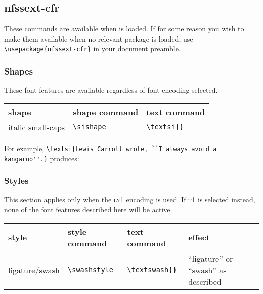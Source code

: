 \documentclass[11pt,british]{article}
\begin{document}
\subsection{nfssext-cfr}

These commands are available when  is loaded. If for some reason you wish to make them available when no relevant package is loaded, use \verb|\usepackage{nfssext-cfr}| in your document preamble.


\subsubsection{Shapes}

These font features are available regardless of font encoding selected.

	\begin{longtable}{lll}
		\toprule
		\textbf{shape}			&	\textbf{shape command}	&	\textbf{text command}\\\midrule\endhead
		\bottomrule\endfoot
		italic small-caps		&	\verb|\sishape|					&	\verb|\textsi{}|\\
	\end{longtable}

	For example, \verb|\textsi{Lewis Carroll wrote, ``I always avoid a kangaroo''.}| produces:
		\begin{center}
		\end{center}

\subsubsection{Styles}

This section applies only when the \textsc{ly1} encoding is used. If \textsc{t1} is selected instead, none of the font features described here will be active.

	\begin{longtable}{llll}
		\toprule
		\textbf{style}			&	\textbf{style command}	&	\textbf{text command}	&	\textbf{effect}\\\midrule\endhead
		\bottomrule\endfoot
		ligature/swash			&	\verb|\swashstyle|				&	\verb|\textswash{}|			&	``ligature'' or ``swash'' as described\\
	\end{longtable}
\end{document}
